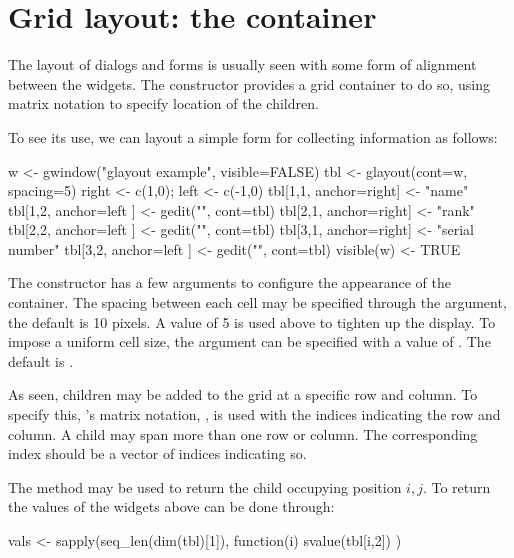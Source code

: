 


\section{Grid layout: the  container}
\label{sec:gWidgets-glayout-container}

The layout of dialogs and forms is usually seen with some form of
alignment between the widgets. The  constructor
provides a grid container to do so, using matrix notation to specify
location of the children.  

To see its use, we can layout a simple form for collecting information
as follows:

\begin{Schunk}
\begin{Sinput}
 w <- gwindow("glayout example", visible=FALSE)
 tbl <- glayout(cont=w, spacing=5)
 right <- c(1,0); left <- c(-1,0)
 tbl[1,1, anchor=right] <- "name"
 tbl[1,2, anchor=left ] <- gedit("", cont=tbl)
 tbl[2,1, anchor=right] <- "rank"
 tbl[2,2, anchor=left ] <- gedit("", cont=tbl)
 tbl[3,1, anchor=right] <- "serial number"
 tbl[3,2, anchor=left ] <- gedit("", cont=tbl)
 visible(w) <- TRUE
\end{Sinput}
\end{Schunk}
%

The constructor has a few arguments to configure the appearance of the
container. The spacing between each cell may be specified through the
 argument, the default is 10 pixels. A
value of 5 is used above to tighten up the display.
To impose a uniform cell size, the 
argument can be specified with a value of . The default is
. 

As seen, children may be added to the grid at a specific row and
column. To specify this, \R's matrix notation, \code{[\ASSIGN}, is
used with the indices indicating the row and column.  A child may span
more than one row or column. The corresponding index should be a
vector of indices indicating so.  

The \code{[} method may be used to
return the child occupying position $i,j$. To return the values of the
widgets above can be done through:
\begin{Schunk}
\begin{Sinput}
 vals <- sapply(seq_len(dim(tbl)[1]), function(i) {
   svalue(tbl[i,2])
   })
\end{Sinput}
\end{Schunk}


